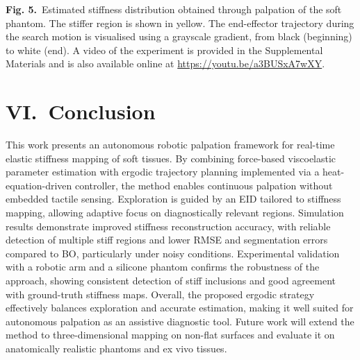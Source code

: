 \documentclass[11pt]{article}
\begin{document}
\newpage

\setcounter{equation}{5}

\begin{center}
\end{center}

\vspace{0.4em}

\textbf{Fig. 5.}\ Estimated stiffness distribution obtained through
palpation of the soft phantom. The stiffer region is shown in yellow.
The end-effector trajectory during the search motion is visualised
using a grayscale gradient, from black (beginning) to white (end). A
video of the experiment is provided in the Supplemental Materials
and is also available online at
\url{https://youtu.be/a3BUSxA7wXY}.

\vspace{0.8em}

\section*{VI.\ Conclusion}

This work presents an autonomous robotic palpation framework for
real-time elastic stiffness mapping of soft tissues. By combining
force-based viscoelastic parameter estimation with ergodic trajectory
planning implemented via a heat-equation-driven controller, the
method enables continuous palpation without embedded tactile sensing.
Exploration is guided by an EID tailored to stiffness mapping,
allowing adaptive focus on diagnostically relevant regions.
Simulation results demonstrate improved stiffness reconstruction
accuracy, with reliable detection of multiple stiff regions and
lower RMSE and segmentation errors compared to BO, particularly
under noisy conditions. Experimental validation with a robotic arm
and a silicone phantom confirms the robustness of the approach,
showing consistent detection of stiff inclusions and good agreement
with ground-truth stiffness maps. Overall, the proposed ergodic
strategy effectively balances exploration and accurate estimation,
making it well suited for autonomous palpation as an assistive
diagnostic tool. Future work will extend the method to
three-dimensional mapping on non-flat surfaces and evaluate it on
anatomically realistic phantoms and ex vivo tissues.
\end{document}
